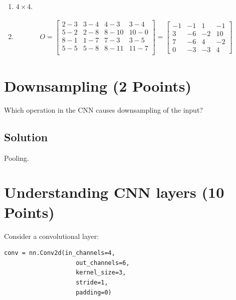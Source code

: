 \documentclass[12pt, xcolor=dvipsnames,svgnames,x11names]{article}
\begin{document}
\begin{enumerate}
\item 


$4 \times 4$.


\item 

\begin{align*}
O = \begin{bmatrix}
2-3 & 3-4 & 4-3 & 3-4\\
5-2 & 2-8 & 8-10 & 10 -0\\
8-1 & 1-7 & 7-3 & 3-5\\
5-5 & 5-8 & 8-11 & 11-7\\
\end{bmatrix} = \begin{bmatrix}
-1 & -1 & 1 & -1\\
3 & -6 & -2 & 10\\
7 & -6 & 4 & -2\\
0 & -3 & -3 & 4\
\end{bmatrix}
\end{align*}

\end{enumerate}





\section{Downsampling \hfill (2 Pooints)}

Which operation in the CNN causes downsampling of the input?

\subsection{Solution}

Pooling.

\section{Understanding CNN layers \hfill \textbf{(10 Points)}}

Consider a convolutional layer:


\begin{verbatim}
conv = nn.Conv2d(in_channels=4,  
                    out_channels=6,
                    kernel_size=3,
                    stride=1,
                    padding=0)
\end{verbatim}
\end{document}

